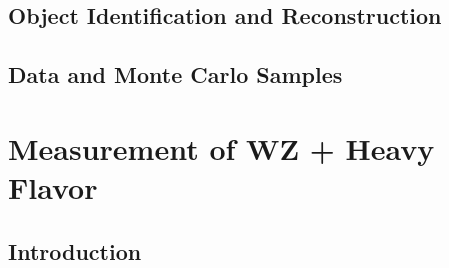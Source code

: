 \documentclass[12pt]{report}	%
\theoremstyle{definition}
\theoremstyle{remark}
\begin{document}
\section{Object Identification and Reconstruction}
\label{sec:objID}



\section{Data and Monte Carlo Samples}
\label{sec:data}


 
\chapter{Measurement of WZ + Heavy Flavor}                                                                                 
\label{part:wz}


\section{Introduction}                                                                                                      
\label{sec:intro}                                                                                                           
                                                                                                      

%
 
\end{document}
